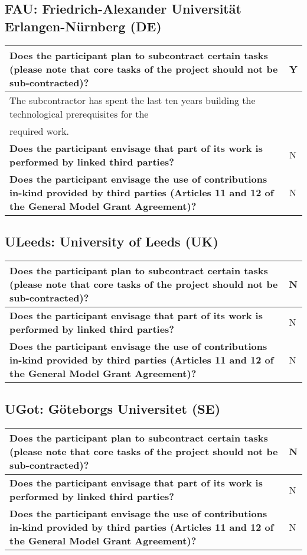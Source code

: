 \subsection*{FAU: Friedrich-Alexander Universität Erlangen-Nürnberg (DE)}

\begin{longtable}{|p{}|p{}|}
\hline
{\bf Does the participant plan to subcontract certain tasks (please
  note that core tasks of the project should not be sub-contracted)?}
&
Y
\\
\hline
\multicolumn{2}{|l|}{The subcontractor has spent the last ten years building the technological
  prerequisites for the}\\
\multicolumn{2}{|l|}{required work. }
\\
\hline
{\bf Does the participant envisage that  part of its work is performed
  by linked third parties?}
&
N
\\
\hline
{\bf Does the participant envisage the use of contributions in-kind
provided by third parties (Articles 11 and 12 of the General Model
Grant Agreement)?}
&
N
\\
\hline
\end{longtable}

\subsection*{ULeeds: University of Leeds (UK)}

\begin{longtable}{|p{}|p{}|}
\hline
{\bf Does the participant plan to subcontract certain tasks (please
  note that core tasks of the project should not be sub-contracted)?}
&
N
\\
\hline
{\bf Does the participant envisage that  part of its work is performed
  by linked third parties?}
&
N
\\
\hline
{\bf Does the participant envisage the use of contributions in-kind
provided by third parties (Articles 11 and 12 of the General Model
Grant Agreement)?}
&
N
\\
\hline
\end{longtable}


\subsection*{UGot: Göteborgs Universitet (SE)}

\begin{longtable}{|p{}|p{}|}
\hline
{\bf Does the participant plan to subcontract certain tasks (please
  note that core tasks of the project should not be sub-contracted)?}
&
N
\\
\hline
{\bf Does the participant envisage that  part of its work is performed
  by linked third parties?}
&
N
\\
\hline
{\bf Does the participant envisage the use of contributions in-kind
provided by third parties (Articles 11 and 12 of the General Model
Grant Agreement)?}
&
N
\\
\hline
\end{longtable}

